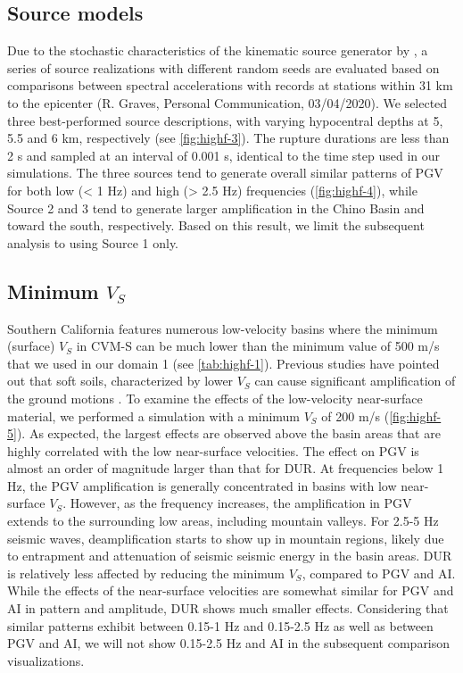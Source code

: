 \subsection{Source models}
Due to the stochastic characteristics of the kinematic source generator by \citet{gravesKinematicGroundMotion2016}, a series of source realizations with different random seeds are evaluated based on comparisons between spectral accelerations with records at stations within 31 km to the epicenter (R. Graves, Personal Communication, 03/04/2020). We selected three best-performed source descriptions, with varying hypocentral depths at 5, 5.5 and 6 km, respectively (see \cref{fig:highf-3}). The rupture durations are less than 2 s and sampled at an interval of 0.001 s, identical to the time step used in our simulations. The three sources tend to generate overall similar patterns of PGV for both low (< 1 Hz) and high (> 2.5 Hz) frequencies (\cref{fig:highf-4}), while Source 2 and 3 tend to generate larger amplification in the Chino Basin and toward the south, respectively. Based on this result, we limit the subsequent analysis to using Source 1 only.

\subsection{Minimum \textbf{$V_S$}}
Southern California features numerous low-velocity basins where the minimum (surface) $V_S$ in CVM-S can be much lower than the minimum value of 500 m/s that we used in our domain 1 (see \cref{tab:highf-1}). Previous studies have pointed out that soft soils, characterized by lower $V_S$ can cause significant amplification of the ground motions . To examine the effects of the low-velocity near-surface material, we performed a simulation with a minimum $V_S$ of 200 m/s (\cref{fig:highf-5}). As expected, the largest effects are observed above the basin areas that are highly correlated with the low near-surface velocities. The effect on PGV is almost an order of magnitude larger than that for DUR. At frequencies below 1 Hz, the PGV amplification is generally concentrated in basins with low near-surface $V_S$. However, as the frequency increases, the amplification in PGV extends to the surrounding low areas, including mountain valleys. For 2.5-5 Hz seismic waves, deamplification starts to show up in mountain regions, likely due to entrapment and attenuation of seismic seismic energy in the basin areas. DUR is relatively less affected by reducing the minimum $V_S$, compared to PGV and AI. While the effects of the near-surface velocities are somewhat similar for PGV and AI in pattern and amplitude, DUR shows much smaller effects. Considering that similar patterns exhibit between 0.15-1 Hz and 0.15-2.5 Hz as well as between PGV and AI, we will not show 0.15-2.5 Hz and AI in the subsequent comparison visualizations.

